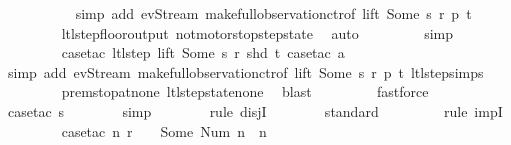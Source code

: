 \begin{isabellebody}
\ \ \ \ \ \ \ \ \ \isamarkupfalse%
\ {\isacharparenleft}simp\ add{\isacharcolon}\ ev{\isacharunderscore}Stream\ make{\isacharunderscore}full{\isacharunderscore}observation{\isachardot}ctr{\isacharbrackleft}of\ lift\ {\isachardoublequoteopen}Some\ s{\isachardoublequoteclose}\ r\ p\ t{\isacharbrackright}{\isacharparenright}\isanewline
\ \ \ \ \ \ \ \isamarkupfalse%
\ ltl{\isacharunderscore}step{\isacharunderscore}floor{\isacharunderscore}output\ not{\isacharunderscore}motorstop{\isacharunderscore}step{\isacharunderscore}state\ \isamarkupfalse%
\ auto{\isacharbrackleft}{}{\isacharbrackright}\isanewline
\ \ \ \ \ \ \ \isamarkupfalse%
\ simp\isanewline
\ \ \ \ \ \ \ \isamarkupfalse%
\ {\isacharparenleft}case{\isacharunderscore}tac\ {\isachardoublequoteopen}ltl{\isacharunderscore}step\ lift\ {\isacharparenleft}Some\ s{\isacharparenright}\ r\ {\isacharparenleft}shd\ t{\isacharparenright}{\isachardoublequoteclose}{\isacharcomma}\ case{\isacharunderscore}tac\ a{\isacharparenright}\isanewline
\ \ \ \ \ \ \ \ \isamarkupfalse%
\ {\isacharparenleft}simp\ add{\isacharcolon}\ ev{\isacharunderscore}Stream\ make{\isacharunderscore}full{\isacharunderscore}observation{\isachardot}ctr{\isacharbrackleft}of\ lift\ {\isachardoublequoteopen}Some\ s{\isachardoublequoteclose}\ r\ p\ t{\isacharbrackright}\ ltl{\isacharunderscore}step{\isachardot}simps{\isacharparenright}\isanewline
\ \ \ \ \ \ \ \isamarkupfalse%
\ prem{\isacharunderscore}stop{\isacharunderscore}at{\isacharunderscore}none\ ltl{\isacharunderscore}step{\isacharunderscore}state{\isacharunderscore}none\ \isamarkupfalse%
\ blast\isanewline
\ \ \ \ \ \ \ \isamarkupfalse%
\ fastforce\isanewline
\isanewline
\ \ \ \ \ \isamarkupfalse%
\ {\isacharparenleft}case{\isacharunderscore}tac\ {\isachardoublequoteopen}s{\isacharequal}{}{\isachardoublequoteclose}{\isacharparenright}\isanewline
\ \ \ \ \ \ \isamarkupfalse%
\ simp\isanewline
\ \ \ \ \ \ \isamarkupfalse%
\ {\isacharparenleft}rule\ disjI{}{\isacharparenright}{\isacharplus}\isanewline
\ \ \ \ \ \ \isamarkupfalse%
\ standard\isanewline
\ \ \ \ \ \ \ \isamarkupfalse%
\ {\isacharparenleft}rule\ impI{\isacharparenright}\isanewline
\ \ \ \ \ \ \ \isamarkupfalse%
\ {\isacharparenleft}case{\isacharunderscore}tac\ {\isachardoublequoteopen}{\isasymexists}n{\isachardot}\ r\ {\isachardollar}\ {}\ {\isacharequal}\ Some\ {\isacharparenleft}Num\ n{\isacharparenright}\ {\isasymand}\ n\ {\isasymin}\ {\isacharbraceleft}{}{\isacharcomma}\ {}{\isacharcomma}\ {}{\isacharcomma}\ {}{\isacharbraceright}{\isachardoublequoteclose}{\isacharparenright}\isanewline

\end{isabellebody}
